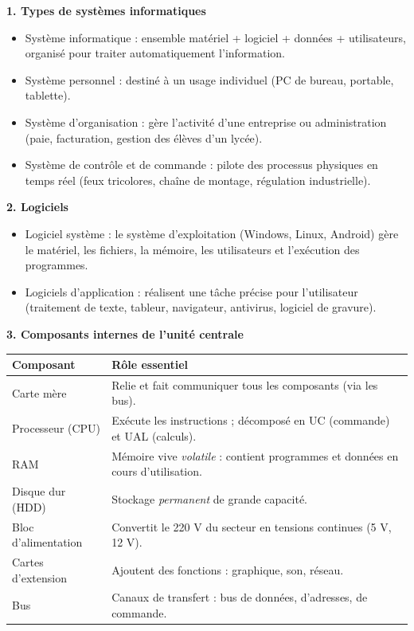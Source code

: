 \documentclass[11pt]{article}
\newcommand{\cle}[1]{{\popxbold\color{popdark}#1}}
\begin{document}
\begin{bilan}
\textbf{1. Types de systèmes informatiques}
\begin{itemize}
  \item \cle{Système informatique} : ensemble matériel + logiciel + données + utilisateurs, organisé pour traiter automatiquement l'information.
  \item \cle{Système personnel} : destiné à un usage individuel (PC de bureau, portable, tablette).
  \item \cle{Système d'organisation} : gère l'activité d'une entreprise ou administration (paie, facturation, gestion des élèves d'un lycée).
  \item \cle{Système de contrôle et de commande} : pilote des processus physiques en temps réel (feux tricolores, chaîne de montage, régulation industrielle).
\end{itemize}

\textbf{2. Logiciels}
\begin{itemize}
  \item \cle{Logiciel système} : le \cle{système d'exploitation} (Windows, Linux, Android) gère le matériel, les fichiers, la mémoire, les utilisateurs et l'exécution des programmes.
  \item \cle{Logiciels d'application} : réalisent une tâche précise pour l'utilisateur (traitement de texte, tableur, navigateur, antivirus, logiciel de gravure).
\end{itemize}

\textbf{3. Composants internes de l'unité centrale}
\begin{center}
\begin{tabularx}{\linewidth}{|l|X|}
\hline
\rowcolor{popblueL} \textbf{Composant} & \textbf{Rôle essentiel} \\
\hline
Carte mère & Relie et fait communiquer tous les composants (via les bus). \\
\hline
Processeur (CPU) & Exécute les instructions ; décomposé en \cle{UC} (commande) et \cle{UAL} (calculs). \\
\hline
RAM & Mémoire vive \emph{volatile} : contient programmes et données en cours d'utilisation. \\
\hline
Disque dur (HDD) & Stockage \emph{permanent} de grande capacité. \\
\hline
Bloc d'alimentation & Convertit le 220 V du secteur en tensions continues (5 V, 12 V). \\
\hline
Cartes d'extension & Ajoutent des fonctions : graphique, son, réseau. \\
\hline
Bus & Canaux de transfert : bus de données, d'adresses, de commande. \\
\hline
\end{tabularx}
\end{center}


\end{bilan}
\end{document}
